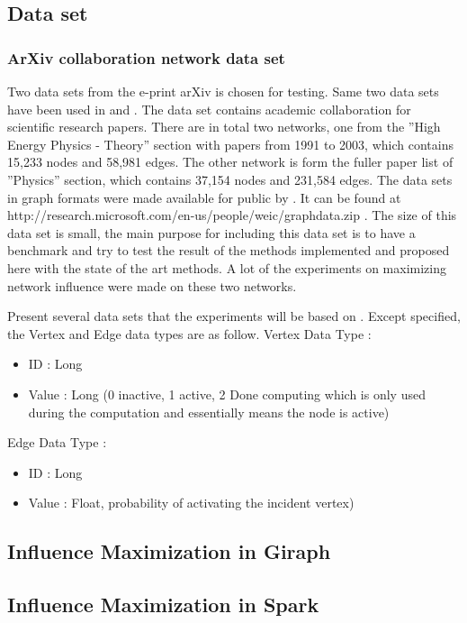 \documentclass[english]{tktltiki}
\begin{document}
\subsection{Data set}
\subsubsection{ArXiv collaboration network data set}
Two data sets from the e-print arXiv is chosen for testing. Same two data sets have been used in \cite{kempe03} and \cite{chen09}. The data set contains academic collaboration for scientific research papers. There are in total two networks, one from the ''High Energy Physics - Theory'' section with papers from 1991 to 2003, which contains 15,233 nodes and 58,981 edges. The other network is form the fuller paper list of ''Physics'' section, which contains 37,154 nodes and 231,584 edges. The data sets in graph formats were made available for public by \cite{chen09}. It can be found at http://research.microsoft.com/en-us/people/weic/graphdata.zip . The size of this data set is small, the main purpose for including this data set is to have a benchmark and try to test the result of the methods implemented and proposed here with the state of the art methods. A lot of the experiments on maximizing network influence were made on these two networks.

Present several data sets that the experiments will be based on .
Except specified, the Vertex and Edge data types are as follow.
Vertex Data Type  :
\begin{itemize}
\item ID : Long
\item Value : Long (0 inactive, 1 active, 2 Done computing which is only used during the computation and essentially means the node is active)
\end{itemize}
Edge Data Type : 
\begin{itemize}
\item ID : Long
\item Value : Float, probability of activating the incident vertex)
\end{itemize}
\subsection{Influence Maximization in Giraph}



\subsection{Influence Maximization in Spark}
\end{document}
